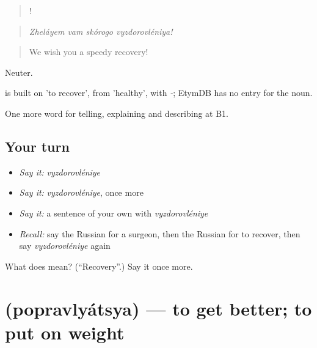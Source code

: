 \begin{quote}
   !
\end{quote}

\begin{quote}
\emph{Zheláyem vam skórogo vyzdorovléniya!}
\end{quote}

\begin{quote}
We wish you a speedy recovery!
\end{quote}

Neuter.

\begin{cousinweb}
\emph{} is built on \emph{} 'to recover', from \emph{} 'healthy', with \emph{-}; EtymDB has no entry for the noun.
\end{cousinweb}

\begin{grammarlens}[title={What you've built}]
One more word for telling, explaining and describing at B1.
\end{grammarlens}

\subsection*{Your turn}
\begin{itemize}
\raggedright
  \item \emph{Say it:} \emph{vyzdorovléniye}
  \item \emph{Say it:} \emph{vyzdorovléniye}, once more
  \item \emph{Say it:} a sentence of your own with \emph{vyzdorovléniye}
  \item \emph{Recall:} say the Russian for a surgeon, then the Russian for to recover, then say \emph{vyzdorovléniye} again
\end{itemize}

\begin{tcolorbox}[breakable,colback=teal!4,colframe=teal!35!black,title={Before you move on}]
What does  mean? (\textquotedblleft{}Recovery\textquotedblright{}.) Say it once more.
\end{tcolorbox}
\section[\texorpdfstring{\ru{поправляться} (popravlyátsya)}{поправляться (popravlyátsya)}]{ (popravlyátsya) — to get better; to put on weight}

